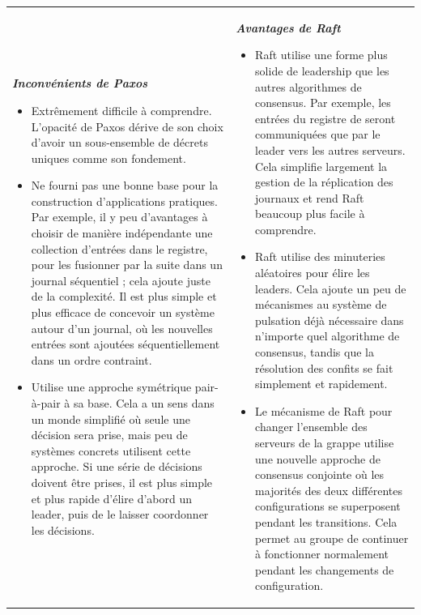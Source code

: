 \begin{tabular}{p{}p{}}
    \noindent
    \textbf{\textit{Inconvénients de Paxos}}
    \small

    \begin{itemize}
        \item Extrêmement difficile à comprendre. L'opacité de Paxos dérive de
            son choix d'avoir un sous-ensemble de décrets uniques comme son
            fondement.
        \item Ne fourni pas une bonne base pour la construction d'applications
            pratiques. Par exemple, il y peu d'avantages à choisir de manière
            indépendante une collection d'entrées dans le registre, pour les
            fusionner par la suite dans un journal séquentiel ; cela ajoute
            juste de la complexité. Il est plus simple et plus efficace de
            concevoir un système autour d'un journal, où les nouvelles entrées
            sont ajoutées séquentiellement dans un ordre contraint.
        \item Utilise une approche symétrique pair-à-pair à sa base. Cela a un
            sens dans un monde simplifié où seule une décision sera prise, mais
            peu de systèmes concrets utilisent cette approche.  Si une série de
            décisions doivent être prises, il est plus simple et plus rapide
            d'élire d'abord un leader, puis de le laisser coordonner les
            décisions.
    \end{itemize} 
    
    &

    \textbf{\textit{Avantages de Raft}}
    \small

    \begin{itemize}
        \item Raft utilise une forme plus solide de leadership que les autres
            algorithmes de consensus. Par exemple, les entrées du registre de
            seront communiquées que par le leader vers les autres serveurs. Cela
            simplifie largement la gestion de la réplication des journaux et
            rend Raft beaucoup plus facile à comprendre.
        \item Raft utilise des minuteries aléatoires pour élire les leaders.
            Cela ajoute un peu de mécanismes au système de pulsation déjà
            nécessaire dans n'importe quel algorithme de consensus, tandis que
            la résolution des confits se fait simplement et rapidement.
        \item Le mécanisme de Raft pour changer l'ensemble des serveurs de la
            grappe utilise une nouvelle approche de consensus conjointe où les
            majorités des deux différentes configurations se superposent pendant
            les transitions. Cela permet au groupe de continuer à fonctionner
            normalement pendant les changements de configuration.
    \end{itemize}

\end{tabular}

